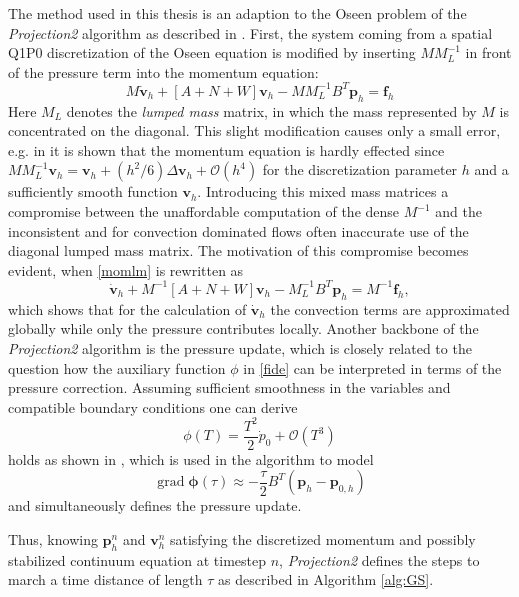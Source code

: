 \documentclass[a4paper,10pt,BCOR=15mm]{scrbook}
\DeclareMathOperator{\grad}{grad}
\begin{document}
The method used in this thesis is an adaption to the Oseen problem of the \textit{Projection2} algorithm as described in \citep{gre1,grc2}. First, the system coming from a spatial Q1P0 discretization of the Oseen equation is modified by inserting $MM_L^{-1}$ in front of the pressure term into the momentum equation:
\begin{equation*}
 M \dot{\mathbf v}_h + [A+N+W] \mathbf v_h - MM_L^{-1}B^T\mathbf  p_h =\mathbf f_h \label{momlm}
\end{equation*}
Here $M_L$ denotes the \textit{lumped mass} matrix, in which the mass represented by $M$ is concentrated on the diagonal. This slight modification causes only a small error, e.g. in \citep[p.~2.3.2a]{gre1} it is shown that the momentum equation is hardly effected since $MM_L^{-1}\mathbf v_h=\mathbf v_h+(h^2/6)\Delta \mathbf v_h + \mathcal O (h^4)$ for the discretization parameter $h$ and a sufficiently smooth function $\mathbf v_h$. Introducing this mixed mass matrices a compromise between the unaffordable computation of the dense $M^{-1}$ and the inconsistent and for convection dominated flows often inaccurate use of the diagonal lumped mass matrix. The motivation of this compromise becomes evident, when \eqref{momlm} is rewritten as
\begin{equation*}
  \dot{\mathbf v}_h + M^{-1}[A+N+W]\mathbf  v_h - M_L^{-1}B^T \mathbf p_h =M^{-1}\mathbf f_h,
\end{equation*}
which shows that for the calculation of $\dot {\mathbf v}_h$ the convection terms are approximated globally while only the pressure contributes locally. Another backbone of the \textit{Projection2} algorithm is the pressure update, which is closely related to the question how the auxiliary function $\phi$ in \eqref{fide} can be interpreted in terms of the pressure correction. Assuming sufficient smoothness in the variables and compatible boundary conditions one can derive 
\begin{equation*}
 \phi(T) = \frac{T^2}{2} \dot p_0 + \mathcal O (T^3)
\end{equation*}
holds as shown in  \cite[p. 595]{grea}, which is used in the algorithm to model 
\begin{equation}\label{phip}
 \grad \mathbf \phi(\tau)  \approx -\frac{\tau }{2}  B^T ( \mathbf p_h -\mathbf  p_{0,h})  
\end{equation}
and simultaneously defines the pressure update. 

Thus, knowing $\mathbf p_h^n$ and $\mathbf v_h^n$ satisfying the discretized momentum and possibly stabilized continuum equation at timestep $n$, \textit{Projection2} defines the steps to march a time distance of length $\tau$ as described in Algorithm \ref{alg:GS}.
\end{document}
